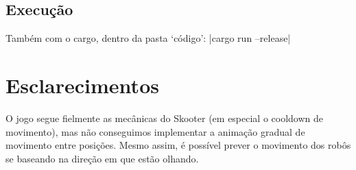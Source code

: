 \documentclass[12pt]{article}
\begin{document}
\subsection{Execução}
Também com o cargo, dentro da pasta `código':
|cargo run --release|

\section{Esclarecimentos}
O jogo segue fielmente as mecânicas do Skooter (em especial o cooldown de movimento), mas não conseguimos implementar a animação gradual de movimento entre posições. Mesmo assim, é possível prever o movimento dos robôs se baseando na direção em que estão olhando.
\end{document}
